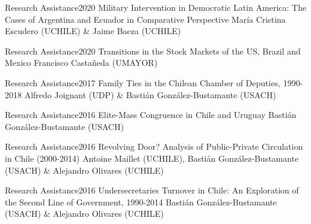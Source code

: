 





\begin{projects}

	\project
	{Research Assistance}{2020}
	{Military Intervention in Democratic Latin America: The Cases of Argentina and Ecuador in Comparative Perspective}
	{María Cristina Escudero (UCHILE) \& Jaime Baeza (UCHILE)}

	\project
	{Research Assistance}{2020}
	{Transitions in the Stock Markets of the US, Brazil and Mexico}
	{Francisco Castañeda (UMAYOR)}
	
	\project
	{Research Assistance}{2017}
	{Family Ties in the Chilean Chamber of Deputies, 1990-2018}
	{Alfredo Joignant (UDP) \& Bastián González-Bustamante (USACH)}
	
\end{projects}

\begin{projects}

	\project
	{Research Assistance}{2016}
	{Elite-Mass Congruence in Chile and Uruguay}
	{Bastián González-Bustamante (USACH)}
	
	\project
	{Research Assistance}{2016}
	{Revolving Door? Analysis of Public-Private Circulation in Chile (2000-2014)}
	{Antoine Maillet (UCHILE), Bastián González-Bustamante (USACH) \& Alejandro Olivares (UCHILE)}

	\project
	{Research Assistance}{2016}
	{Undersecretaries Turnover in Chile: An Exploration of the Second Line of Government, 1990-2014}
	{Bastián González-Bustamante (USACH) \& Alejandro Olivares (UCHILE)}
	
\end{projects}
